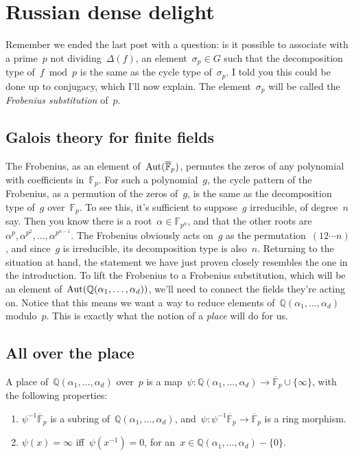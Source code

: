 \section{Russian dense delight}

Remember we ended the last post with a question: is it possible to associate with a prime~$p$ not dividing~$\Delta(f)$, an element~$\sigma_{p} \in G$ such that the decomposition type of~$f\bmod p$ is the same as the cycle type of~$\sigma_{p}$. I told you this could be done up to conjugacy, which I'll now explain. The element~$\sigma_{p}$ will be called the \emph{Frobenius substitution} of~$p$.

\subsection{Galois theory for finite fields}
The Frobenius, as an element of~$\operatorname{Aut}(\overline{\mathbb{F}}_{p})$, permutes the zeros of any polynomial with coefficients in~$\mathbb{F}_{p}$. For such a polynomial~$g$, the cycle pattern of the Frobenius, as a permution of the zeros of~$g$, is the same as the decomposition type of~$g$ over~$\mathbb{F}_{p}$. To see this, it's sufficient to suppose~$g$ irreducible, of degree~$n$ say. Then you know there is a root~$\alpha \in \mathbb{F}_{p^{n}}$, and that the other roots are~$\alpha^{p}, \alpha^{p^{2}},\ldots,\alpha^{p^{n-1}}$. The Frobenius obviously acts on~$g$ as the permutation~$(12\cdots n)$, and since~$g$ is irreducible, its decomposition type is also~$n$. Returning to the situation at hand, the statement we have just proven closely resembles the one in the introduction. To lift the Frobenius to a Frobenius substitution, which will be an element of~$\operatorname{Aut}(\mathbb{Q}(\alpha_{1},\ldots,\alpha_{d}))$, we'll need to connect the fields they're acting on. Notice that this means we want a way to reduce elements of~$\mathbb{Q}(\alpha_{1},\ldots,\alpha_{d})$ modulo~$p$. This is exactly what the notion of a \emph{place} will do for us.

\subsection{All over the place}
A place of~$\mathbb{Q}(\alpha_{1},\ldots,\alpha_{d})$ over~$p$ is a map~$\psi:\mathbb{Q}(\alpha_{1},\ldots,\alpha_{d}) \to \overline{\mathbb{F}}_{p}
\cup \{ \infty \}$, with the following properties:
\begin{enumerate}
  \item $\psi^{-1} \overline{\mathbb{F}}_{p}$ is a subring of~$\mathbb{Q}(\alpha_{1},\ldots,\alpha_{d})$, and~$\psi:\psi^{-1} \overline{\mathbb{F}}_{p} \to \overline{\mathbb{F}}_{p}$ is a ring morphism.
  \item $\psi(x)=\infty$ iff~$\psi(x^{-1})=0$, for an~$x \in \mathbb{Q}(\alpha_{1},\ldots,\alpha_{d})-\{0\}$.
\end{enumerate}

